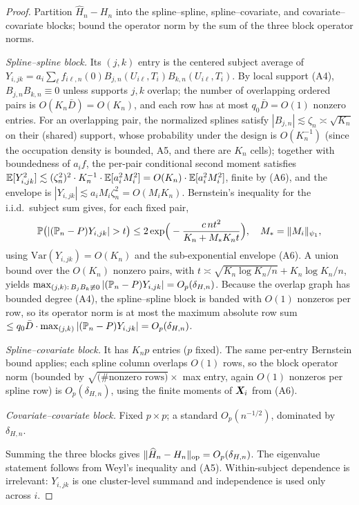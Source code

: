 \begin{proof}
Partition $\widehat H_n-H_n$ into the spline--spline, spline--covariate, and
covariate--covariate blocks; bound the operator norm by the sum of the three
block operator norms.

\emph{Spline--spline block.} Its $(j,k)$ entry is the centered subject average of
$Y_{i,jk}=a_i\sum_\ell f_{i\ell,n}(0)B_{j,n}(U_{i\ell},T_i)B_{k,n}(U_{i\ell},T_i)$.
By local support (A4), $B_{j,n}B_{k,n}\equiv0$ unless supports $j,k$ overlap; the
number of overlapping ordered pairs is $O(K_n\bar D)=O(K_n)$, and each row has at
most $q_0\bar D=O(1)$ nonzero entries. For an overlapping pair, the normalized
splines satisfy $|B_{j,n}|\lesssim\zeta_n\asymp\sqrt{K_n}$ on their (shared)
support, whose probability under the design is $O(K_n^{-1})$ (since the
occupation density is bounded, A5, and there are $K_n$ cells); together with
boundedness of $a_i f$, the per-pair conditional second moment satisfies
$\mathbb{E}[Y_{i,jk}^2]\lesssim (\zeta_n^2)^2\cdot K_n^{-1}\cdot\mathbb{E}[a_i^2 M_i^2]
=O(K_n)\cdot\mathbb{E}[a_i^2 M_i^2]$, finite by (A6), and the envelope is
$|Y_{i,jk}|\lesssim a_i M_i\zeta_n^2=O(M_i K_n)$. Bernstein's inequality for the
i.i.d.\ subject sum gives, for each fixed pair,
\[
\PR\big(|(\Pn-P)Y_{i,jk}|>t\big)\le
2\exp\!\Big(-\frac{c\,n t^2}{K_n+M_*K_n t}\Big),\quad M_*=\|M_i\|_{\psi_1},
\]
using $\mathrm{Var}(Y_{i,jk})=O(K_n)$ and the sub-exponential envelope (A6). A
union bound over the $O(K_n)$ nonzero pairs, with $t\asymp\sqrt{K_n\log K_n/n}
+K_n\log K_n/n$, yields $\max_{(j,k):\,B_jB_k\not\equiv0}|(\mathbb{P}_n-P)Y_{i,jk}|
=O_p(\delta_{H,n})$. Because the overlap graph has bounded degree (A4), the
spline--spline block is banded with $O(1)$ nonzeros per row, so its operator norm
is at most the maximum absolute row sum $\le q_0\bar D\cdot
\max_{(j,k)}|(\mathbb{P}_n-P)Y_{i,jk}|=O_p(\delta_{H,n})$.

\emph{Spline--covariate block.} It has $K_n p$ entries ($p$ fixed). The same
per-entry Bernstein bound applies; each spline column overlaps $O(1)$ rows, so
the block operator norm (bounded by $\sqrt{\text{(\#nonzero rows)}}\times$ max
entry, again $O(1)$ nonzeros per spline row) is $O_p(\delta_{H,n})$, using the
finite moments of $\bm{X}_i$ from (A6).

\emph{Covariate--covariate block.} Fixed $p\times p$; a standard
$O_p(n^{-1/2})$, dominated by $\delta_{H,n}$.

Summing the three blocks gives $\|\widehat H_n-H_n\|_{\mathrm{op}}=O_p(\delta_{H,n})$.
The eigenvalue statement follows from Weyl's inequality and (A5). Within-subject
dependence is irrelevant: $Y_{i,jk}$ is one cluster-level summand and
independence is used only across $i$.
\end{proof}

